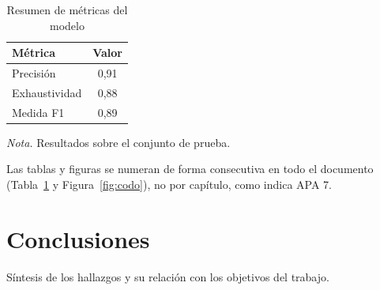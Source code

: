 \documentclass[12pt,oneside,onehalfspace,apa,spanish]{upbthesis}
\begin{document}
\begin{table}[htbp]
  \caption{Resumen de métricas del modelo}
  \label{tab:metricas}
  \centering
  \begin{tabular}{lc}
    \toprule
    Métrica & Valor \\
    \midrule
    Precisión & 0,91 \\
    Exhaustividad & 0,88 \\
    Medida F1 & 0,89 \\
    \bottomrule
  \end{tabular}

  \smallskip
  {\footnotesize \textit{Nota.} Resultados sobre el conjunto de prueba.}
\end{table}

Las tablas y figuras se numeran de forma consecutiva en todo el documento
(Tabla~\ref{tab:metricas} y Figura~\ref{fig:codo}), no por capítulo, como
indica APA 7.

\chapter{Conclusiones}
Síntesis de los hallazgos y su relación con los objetivos del trabajo.

\printbibliography[heading=bibintoc,title={Referencias}]
\end{document}
